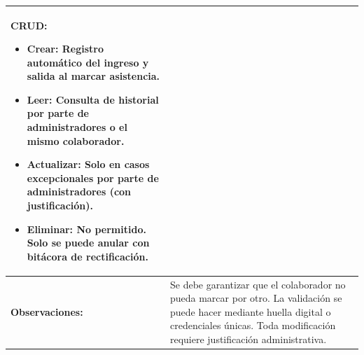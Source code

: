 \begin{table}[h]
\begin{tabular}{|p{5cm}|p{9cm}|}
		\textbf{CRUD:}
		\begin{itemize}
			\item \textbf{Crear:} Registro automático del ingreso y salida al marcar asistencia.
			\item \textbf{Leer:} Consulta de historial por parte de administradores o el mismo colaborador.
			\item \textbf{Actualizar:} Solo en casos excepcionales por parte de administradores (con justificación).
			\item \textbf{Eliminar:} No permitido. Solo se puede anular con bitácora de rectificación.
		\end{itemize}
		\\ \hline
		\textbf{Observaciones:}                   & Se debe garantizar que el colaborador no pueda marcar por otro. La validación se puede hacer mediante huella digital o credenciales únicas. Toda modificación requiere justificación administrativa.
		\\ \hline
	\end{tabular}
\end{table}


